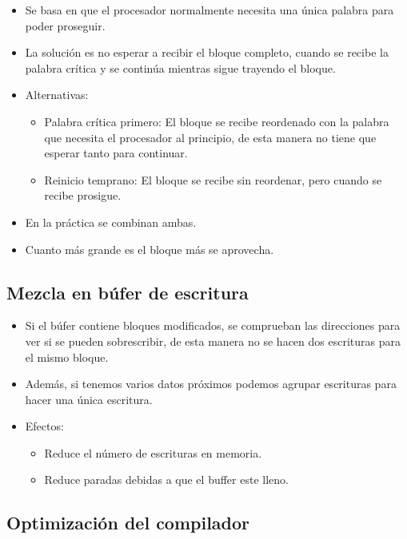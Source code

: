 \documentclass[12pt, twoside, openright]{report} %
\begin{document}
\begin{itemize}

	\item Se basa en que el procesador normalmente necesita una única
	      palabra para poder proseguir.
	\item La solución es no esperar a recibir el bloque completo, cuando se
	      recibe la palabra crítica y se continúa mientras sigue trayendo el
	      bloque.
	\item Alternativas:

	      \begin{itemize}

		      \item Palabra crítica primero: El bloque se recibe reordenado con la
		            palabra que necesita el procesador al principio, de esta manera
		            no tiene que esperar tanto para continuar.
		      \item Reinicio temprano: El bloque se recibe sin reordenar, pero
		            cuando se recibe prosigue.
	      \end{itemize}
	\item En la práctica se combinan ambas.
	\item Cuanto más grande es el bloque más se aprovecha.
\end{itemize}
\subsection{Mezcla en búfer de escritura}

\begin{itemize}

	\item Si el búfer contiene bloques modificados, se comprueban las
	      direcciones para ver si se pueden sobrescribir, de esta manera no
	      se hacen dos escrituras para el mismo bloque.
	\item Además, si tenemos varios datos próximos podemos agrupar
	      escrituras para hacer una única escritura.
	\item Efectos:

	      \begin{itemize}

		      \item Reduce el número de escrituras en memoria.
		      \item Reduce paradas debidas a que el buffer este lleno.
	      \end{itemize}
\end{itemize}
\subsection{Optimización del compilador}
\end{document}
